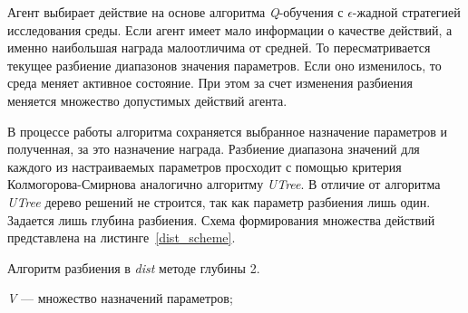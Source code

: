 Агент выбирает действие на основе алгоритма \textit{Q}-обучения с $\epsilon$-жадной стратегией исследования среды. Если агент имеет мало информации о качестве действий, а именно наибольшая награда малоотличима от средней. То пересматривается текущее разбиение диапазонов значения параметров. Если оно изменилось, то среда меняет активное состояние. При этом за счет изменения разбиения меняется множество допустимых действий агента.

В процессе работы алгоритма сохраняется выбранное назначение параметров и полученная, за это назначение награда. Разбиение диапазона значений для каждого из настраиваемых параметров просходит с помощью критерия Колмогорова-Смирнова аналогично алгоритму \textit{UTree}. В отличие от алгоритма \textit{UTree} дерево решений не строится, так как параметр разбиения лишь один. Задается лишь глубина разбиения. Схема формирования множества действий представлена на листинге~\ref{dist_scheme}.


\begin{algorithm}[h!]
    \caption{Алгоритм разбиения в \textit{dist} методе глубины 2.}
    \label{dist_scheme}
    \begin{algorithmic}[1]
	\REQUIRE  
	  \textit{V} --- множество назначений параметров;
	  \ELSE
	      \STATE {$P \gets \{[v_{min}, s], (s, v_{max}]\}$}
	      \STATE {$P \gets \{[v_{min}, s], (s, s_r], (s_r, v_{max}]\}$}
	      \STATE {$P \gets \{[v_{min}, s_l], (s_l, s], (s, v_{max}]\}$}
	     \ELSE
	      \STATE {$P \gets \{[v_{min}, s_l], (s_l, s], (s, s_r], (s_r, v_{max}]\}$}
	    \ENDIF
	  \ENDIF
        \ENDFOR
    \end{algorithmic}
\end{algorithm}
